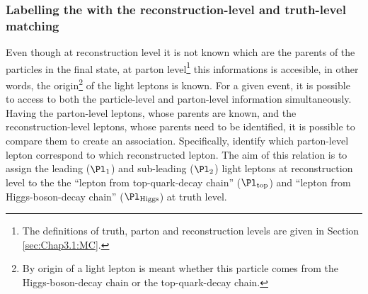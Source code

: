 \subsubsection{Labelling the \dilepSStau with the reconstruction-level and truth-level matching}
\label{sec:tHq:origin:LeptonAssignment_truth_reco_DeltaRCone}
Even though at reconstruction level it is not known which are the parents of the particles in the final
state, at parton level\footnote{The definitions of truth, parton and reconstruction levels are given in
Section \ref{sec:Chap3.1:MC}.} this informations is accesible, in other words, the origin\footnote{By origin of a 
light lepton is meant whether this particle comes from the Higgs-boson-decay chain or the top-quark-decay chain.}
 of the light leptons is known.
For a given event, it is possible to access to both the particle-level and parton-level information simultaneously.
Having the parton-level leptons, whose parents are known, and the reconstruction-level leptons, whose parents
need to be identified, it is possible to compare them to create an association. Specifically, identify which 
parton-level lepton correspond to which reconstructed lepton.
The aim of this relation is to assign the leading ($\Pl_{1}$) and sub-leading ($\Pl_{2}$) light leptons at reconstruction level to the
the ``lepton from top-quark-decay chain'' ($\Pl_{\text{top}}$) and ``lepton from Higgs-boson-decay chain'' ($\Pl_{\text{Higgs}}$) 
at truth level. 

